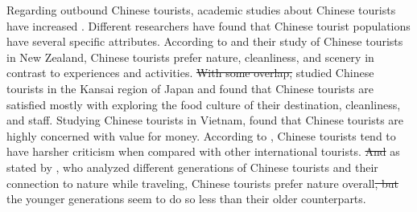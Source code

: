 \documentclass[smallextended,natbib]{svjour3}       %
\providecommand{\DIFadd}[1]{{\protect\color{blue}\uwave{#1}}} %
\providecommand{\DIFdel}[1]{{\protect\color{red}\sout{#1}}}                      %
\providecommand{\DIFaddbegin}{} %
\providecommand{\DIFaddend}{} %
\providecommand{\DIFdelbegin}{} %
\providecommand{\DIFdelend}{} %
\newcommand{\DIFscaledelfig}{0.5}
\newlength{\DIFdelgraphicswidth} %
\newlength{\DIFdelgraphicsheight} %
\newcommand{\DIFaddincludegraphics}[2][]{{\color{blue}\fbox{\DIFOincludegraphics[#1]{#2}}}} %
\newcommand{\DIFdelincludegraphics}[2][]{%
\sbox{\DIFdelgraphicsbox}{\DIFOincludegraphics[#1]{#2}}%
\settoboxwidth{\DIFdelgraphicswidth}{\DIFdelgraphicsbox} %
\settoboxtotalheight{\DIFdelgraphicsheight}{\DIFdelgraphicsbox} %
\scalebox{\DIFscaledelfig}{%
\parbox[b]{\DIFdelgraphicswidth}{\usebox{\DIFdelgraphicsbox}\\[-\baselineskip] \rule{\DIFdelgraphicswidth}{0em}}\llap{\resizebox{\DIFdelgraphicswidth}{\DIFdelgraphicsheight}{%
\setlength{\unitlength}{\DIFdelgraphicswidth}%
\begin{picture}(1,1)%
\thicklines\linethickness{2pt} %
{\color[rgb]{1,0,0}\put(0,0){\framebox(1,1){}}}%
{\color[rgb]{1,0,0}\put(0,0){\line( 1,1){1}}}%
{\color[rgb]{1,0,0}\put(0,1){\line(1,-1){1}}}%
\end{picture}%
}\hspace*{3pt}}} %
} %
\DeclareRobustCommand{\DIFaddbegin}{\DIFOaddbegin \let\includegraphics\DIFaddincludegraphics} %
\DeclareRobustCommand{\DIFaddend}{\DIFOaddend \let\includegraphics\DIFOincludegraphics} %
\DeclareRobustCommand{\DIFdelbegin}{\DIFOdelbegin \let\includegraphics\DIFdelincludegraphics} %
\DeclareRobustCommand{\DIFdelend}{\DIFOaddend \let\includegraphics\DIFOincludegraphics} %
\begin{document}
Regarding outbound Chinese tourists, academic studies about Chinese tourists have increased \cite[][]{sun2017}. Different researchers have found that Chinese tourist populations have several specific attributes. According to \cite{ryan2001} and their study of Chinese tourists in New Zealand, Chinese tourists prefer nature, cleanliness, and scenery in contrast to experiences and activities. \DIFdelbegin \DIFdel{With some overlap, }\DIFdelend \cite{dongyang2015} studied Chinese tourists in the Kansai region of Japan and found that Chinese tourists are satisfied mostly with exploring the food culture of their destination, cleanliness, and staff. Studying Chinese tourists in Vietnam, \cite{truong2009} found that Chinese tourists are highly concerned with value for money. According to \cite{liu2019}, Chinese tourists tend to have harsher criticism when compared with other international tourists. \DIFdelbegin \DIFdel{And }\DIFdelend \DIFaddbegin \DIFadd{Moreover, }\DIFaddend as stated by \cite{gao2017chinese}, who analyzed different generations of Chinese tourists and their connection to nature while traveling, Chinese tourists prefer nature overall\DIFdelbegin \DIFdel{, but }\DIFdelend \DIFaddbegin \DIFadd{. However, }\DIFaddend the younger generations seem to do so less than their older counterparts. 
\end{document}
